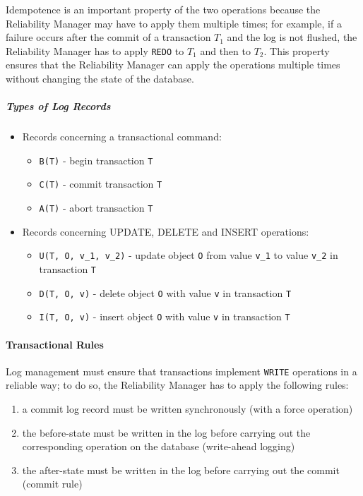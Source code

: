 \documentclass[english]{article}
\begin{document}
Idempotence is an important property of the two operations because the Reliability Manager may have to apply them multiple times;
for example, if a failure occurs after the commit of a transaction \(T_1\) and the log is not flushed, the Reliability Manager has to apply \texttt{REDO} to \(T_1\) and then to \(T_2\).
This property ensures that the Reliability Manager can apply the operations multiple times without changing the state of the database.

\subparagraph*{Types of Log Records}

\begin{itemize}
  \item Records concerning a transactional command:
        \begin{itemize}[label=\texttt{>}]
          \item \texttt{B(T)} - begin transaction \texttt{T}
          \item \texttt{C(T)} - commit transaction \texttt{T}
          \item \texttt{A(T)} - abort transaction \texttt{T}
        \end{itemize}
  \item Records concerning UPDATE, DELETE and INSERT operations:
        \begin{itemize}
          \item \texttt{U(T, O, v\_1, v\_2)} - update object \texttt{O} from value \texttt{v\_1} to value \texttt{v\_2} in transaction \texttt{T}
          \item \texttt{D(T, O, v)} - delete object \texttt{O} with value \texttt{v} in transaction \texttt{T}
          \item \texttt{I(T, O, v)} - insert object \texttt{O} with value \texttt{v} in transaction \texttt{T}
        \end{itemize}
\end{itemize}

\paragraph{Transactional Rules}

Log management must ensure that transactions implement \texttt{WRITE} operations in a reliable way;
to do so, the Reliability Manager has to apply the following rules:

\begin{enumerate}
  \item\label{enum:transactional-rules-1} a commit log record must be written synchronously (with a force operation)
  \item\label{enum:transactional-rules-2} the before-state must be written in the log before carrying out the corresponding operation on the database (write-ahead logging)
  \item\label{enum:transactional-rules-3} the after-state must be written in the log before carrying out the commit (commit rule)
\end{enumerate}
\end{document}

